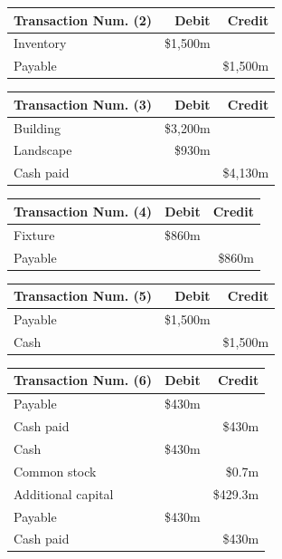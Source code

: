 \documentclass[
  letterpaper,
  DIV=11,
  numbers=noendperiod]{scrreprt}
\begin{document}
\begin{longtable}[]{@{}lrr@{}}
\toprule\noalign{}
Transaction Num. (2) & Debit & Credit \\
\midrule\noalign{}
\endhead
\bottomrule\noalign{}
\endlastfoot
Inventory & \$1,500m & \\
Payable & & \$1,500m \\
\end{longtable}

\begin{longtable}[]{@{}lrr@{}}
\toprule\noalign{}
Transaction Num. (3) & Debit & Credit \\
\midrule\noalign{}
\endhead
\bottomrule\noalign{}
\endlastfoot
Building & \$3,200m & \\
Landscape & \$930m & \\
Cash paid & & \$4,130m \\
\end{longtable}

\begin{longtable}[]{@{}lrr@{}}
\toprule\noalign{}
Transaction Num. (4) & Debit & Credit \\
\midrule\noalign{}
\endhead
\bottomrule\noalign{}
\endlastfoot
Fixture & \$860m & \\
Payable & & \$860m \\
\end{longtable}

\begin{longtable}[]{@{}lrr@{}}
\toprule\noalign{}
Transaction Num. (5) & Debit & Credit \\
\midrule\noalign{}
\endhead
\bottomrule\noalign{}
\endlastfoot
Payable & \$1,500m & \\
Cash & & \$1,500m \\
\end{longtable}

\begin{longtable}[]{@{}lrr@{}}
\toprule\noalign{}
Transaction Num. (6) & Debit & Credit \\
\midrule\noalign{}
\endhead
\bottomrule\noalign{}
\endlastfoot
Payable & \$430m & \\
Cash paid & & \$430m \\
Cash & \$430m & \\
Common stock & & \$0.7m \\
Additional capital & & \$429.3m \\
Payable & \$430m & \\
Cash paid & & \$430m \\
\end{longtable}
\end{document}
